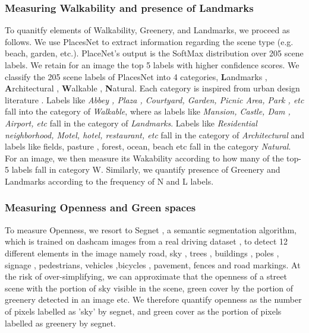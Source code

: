 \subsubsection{Measuring Walkability and presence of Landmarks}
To quanitfy elements of Walkability, Greenery, and Landmarks, we proceed as follows. %
We use PlacesNet \cite{zhou2014learning} to extract information regarding the scene type (e.g. beach, garden, etc.). PlaceNet's output is the SoftMax distribution over 205 scene labels. We retain for an image the top 5 labels with higher confidence scores.
We classify the 205 scene labels of PlacesNet into 4 categories, \textbf{L}andmarks , \textbf{A}rchitectural , \textbf{W}alkable , \textbf{N}atural. Each category is inspired from  urban design literature \cite{ewing2013measuring}.  Labels like \textit{Abbey , Plaza , Courtyard, Garden, Picnic Area, Park , etc} fall into the category of \textit{Walkable}, where as labels like \textit{Mansion, Castle, Dam , Airport, etc} fall in the category of \textit{Landmarks}. Labels like \textit{Residential neighborhood, Motel, hotel, restaurant, etc} fall in the category of \textit{Architectural} and labels like {fields, pasture , forest, ocean, beach etc } fall in the category \textit{Natural}. %
For an image, we then measure its Wakability according to how many of the top-5 labels fall in category W. Similarly, we quantify presence of Greenery and Landmarks according to the frequency of N and L labels.%

\subsubsection{Measuring Openness and Green spaces}
To measure Openness, we resort to   Segnet \cite{badrinarayanan2015segnet}, a semantic segmentation algorithm, which is trained on dashcam images from a real driving dataset , to detect 12 different elements in the image namely road, sky , trees ,  buildings , poles , signage , pedestrians, vehicles ,bicycles , pavement, fences and road markings. At the risk of over-simplifying, we can approximate that the openness of a street scene with the portion of sky visible in the scene, green cover by the portion of greenery detected in an image etc. We therefore quantify openness as the number of pixels labelled as 'sky' by segnet, and green cover as the portion of pixels labelled as greenery by segnet. 

